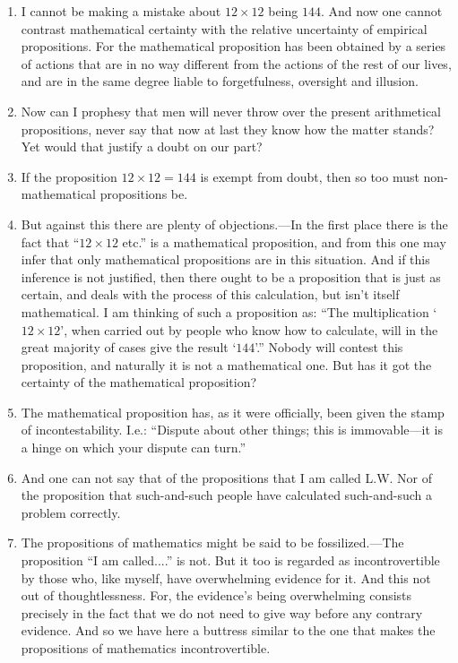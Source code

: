 \documentclass{book}
\begin{document}
\begin{enumerate}
\item
I cannot be making a mistake about $12{\times}12$ being $144$. And now one
cannot contrast mathematical certainty with the relative uncertainty of
empirical propositions.  For the mathematical proposition has been obtained by
a series of actions that are in no way different from the actions of the rest
of our lives, and are in the same degree liable to forgetfulness, oversight and
illusion.

\item
Now can I prophesy that men will never throw over the present arithmetical
propositions, never say that now at last they know how the matter stands? Yet
would that justify a doubt on our part?

\item
If the proposition $12{\times}12=144$ is exempt from doubt, then so too must
non-mathematical propositions be.

\item
But against this there are plenty of objections.---In the first place there
is the fact that ``$12{\times}12$ etc.'' is a mathematical proposition, and
from this one may infer that only mathematical propositions are in this
situation. And if this inference is not justified, then there ought to be a
proposition that is just as certain, and deals with the process of this
calculation, but isn't itself mathematical. I am thinking of such a proposition
as: ``The multiplication `$12{\times}12$', when carried out by people who know
how to calculate, will in the great majority of cases give the result `$144$'.''
Nobody will contest this proposition, and naturally it is not a mathematical
one. But has it got the certainty of the mathematical proposition?

\item
The mathematical proposition has, as it were officially, been given the stamp
of incontestability. I.e.: ``Dispute about other things; this is immovable---it
is a hinge on which your dispute can turn.''

\item
And one can not say that of the propositions that I am called L.W. Nor of the
proposition that such-and-such people have calculated such-and-such a problem
correctly.

\item
The propositions of mathematics might be said to be fossilized.---The
proposition ``I am called....'' is not. But it too is regarded as
incontrovertible by those who, like myself, have overwhelming evidence for it.
And this not out of thoughtlessness. For, the evidence's being overwhelming
consists precisely in the fact that we do not need to give way before any
contrary evidence. And so we have here a buttress similar to the one that makes
the propositions of mathematics incontrovertible.


\end{enumerate}
\end{document}
